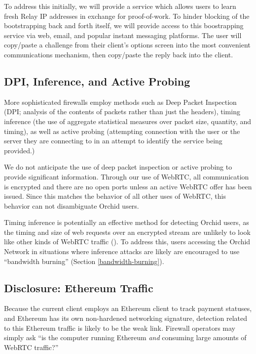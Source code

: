 \documentclass{article}
\newcommand{\orchid}{Orchid}
\newcommand{\Orchid}{\orchid}
\begin{document}
To address this initially, we will provide a service which allows
users to learn fresh Relay IP addresses in exchange for proof-of-work.
To hinder blocking of the bootstrapping back and forth itself, we will
provide access to this boostrapping service via web, email, and
popular instant messaging platforms. The user will copy/paste a
challenge from their client's options screen into the most convenient
communications mechanism, then copy/paste the reply back into the
client.

\subsection{DPI, Inference, and Active Probing}

More sophisticated firewalls employ methods such as Deep Packet
Inspection (DPI; analysis of the contents of packets rather than just
the headers), timing inference (the use of aggregate statistical
measures over packet size, quantity, and timing), as well as active
probing (attempting connection with the user or the server they are
connecting to in an attempt to identify the service being provided.)

We do not anticipate the use of deep packet inspection or active
probing to provide significant information. Through our use of WebRTC,
all communication is encrypted and there are no open ports unless an
active WebRTC offer has been issued. Since this matches the behavior
of all other uses of WebRTC, this behavior can not disambiguate \Orchid{}
users.

Timing inference is potentially an effective method for detecting
\Orchid{} users, as the timing and size of web requests over an encrypted
stream are unlikely to look like other kinds of WebRTC traffic
(\cite{peekaboo}). To address this, users accessing the \Orchid{} Network
in situations where inference attacks are likely are encouraged to use
``bandwidth burning'' (Section \ref{bandwidth-burning}).

\subsection{Disclosure: Ethereum Traffic}

Because the current client employs an Ethereum client to track payment
statuses, and Ethereum has its own non-hardened networking signature,
detection related to this Ethereum traffic is likely to be the weak
link. Firewall operators may simply ask ``is the computer running
Ethereum \emph{and} consuming large amounts of WebRTC traffic?''
\end{document}
